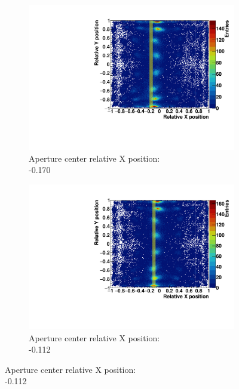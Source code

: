 \begin{figure}
\begin{subfigure}[t]{0.32\textwidth}
\centering
\includegraphics[width=\textwidth]{03_GraphicFiles/chapter3_CLaRySproto/Absorber/images_scan/line_1mm/run00018_floodMap.pdf}
\caption{Aperture center relative X position: \\ -0.170}
\label{chap3::fig::scan_map5_1mm}
\end{subfigure}
\begin{subfigure}[t]{0.32\textwidth}
\centering
\includegraphics[width=\textwidth]{03_GraphicFiles/chapter3_CLaRySproto/Absorber/images_scan/line_1mm/run00019_floodMap.pdf}
\caption{Aperture center relative X position: \\ -0.112}
\label{chap3::fig::scan_map6_1mm}
\end{subfigure}
\newline

\end{figure}
